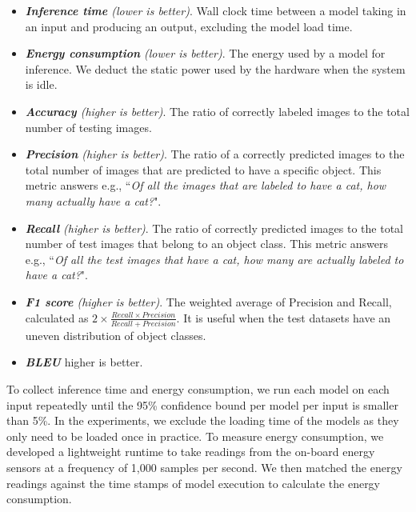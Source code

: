 \begin{itemize}
\item \emph{\textbf{Inference time} (lower is better)}. Wall clock time between a model taking in an input and producing an output,
    excluding the model load time.

\item \emph{\textbf{Energy consumption} (lower is better)}. The energy used by a model for inference.  We deduct the static power used by
    the hardware when the system is idle.

\item \emph{\textbf{Accuracy} (higher is better)}. The ratio of correctly labeled images to the total number of testing images.

\item \emph{\textbf{Precision} (higher is better)}. The ratio of a correctly predicted images to the total number of images that are
    predicted to have a specific object. This metric answers e.g., ``\emph{Of all the images that are labeled to have a cat, how many
    actually have a cat?}".

\item \emph{\textbf{Recall} (higher is better)}. The ratio of correctly predicted images to the total number of test images that belong
    to an object class. This metric answers e.g., ``\emph{Of all the test images that have a cat, how many are actually labeled to have a
    cat?}".

\item \emph{\textbf{F1 score} (higher is better)}.  The weighted average of Precision and Recall, calculated as $2\times\frac{Recall
    \times Precision} {Recall + Precision}$. It is useful when the test datasets have an uneven distribution of object classes.

\item \emph{\textbf{BLEU}} {higher is better}. 

\end{itemize}

  To collect inference time and energy consumption, we run each model on each input repeatedly until the
95\% confidence bound per model per input is smaller than 5\%. In the experiments, we exclude the loading time of the \CNN models as they
only need to be loaded once in practice. To measure energy consumption, we developed a lightweight runtime to take readings from the
on-board energy sensors at a frequency of 1,000 samples per second. We then matched the energy readings against the time stamps of model
execution to calculate the energy consumption.
